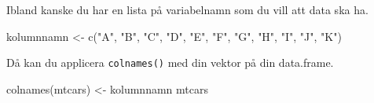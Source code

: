 \documentclass[
]{book}
\newenvironment{Shaded}{\begin{snugshade}}{\end{snugshade}}
\newcommand{\FunctionTok}[1]{\textcolor[rgb]{0.00,0.00,0.00}{#1}}
\newcommand{\NormalTok}[1]{#1}
\newcommand{\OtherTok}[1]{\textcolor[rgb]{0.56,0.35,0.01}{#1}}
\newcommand{\StringTok}[1]{\textcolor[rgb]{0.31,0.60,0.02}{#1}}
\begin{document}
Ibland kanske du har en lista på variabelnamn som du vill att data ska ha.

\begin{Shaded}
\begin{Highlighting}[]
\NormalTok{kolumnnamn }\OtherTok{\textless{}{-}} \FunctionTok{c}\NormalTok{(}\StringTok{"A"}\NormalTok{, }\StringTok{"B"}\NormalTok{, }\StringTok{"C"}\NormalTok{, }\StringTok{"D"}\NormalTok{, }\StringTok{"E"}\NormalTok{, }\StringTok{"F"}\NormalTok{, }\StringTok{"G"}\NormalTok{, }\StringTok{"H"}\NormalTok{, }\StringTok{"I"}\NormalTok{, }\StringTok{"J"}\NormalTok{, }\StringTok{"K"}\NormalTok{)}
\end{Highlighting}
\end{Shaded}

Då kan du applicera \texttt{colnames()} med din vektor på din data.frame.

\begin{Shaded}
\begin{Highlighting}[]
\FunctionTok{colnames}\NormalTok{(mtcars) }\OtherTok{\textless{}{-}}\NormalTok{ kolumnnamn}
\NormalTok{mtcars}
\end{Highlighting}
\end{Shaded}
\end{document}
